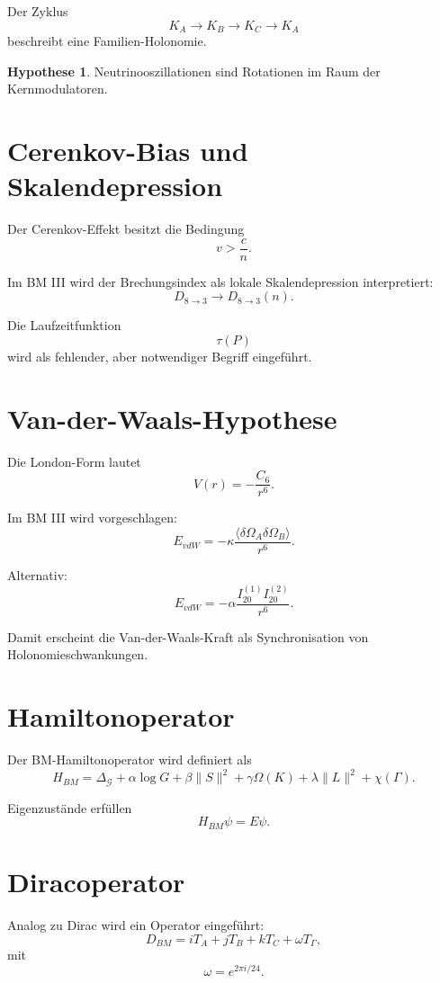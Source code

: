 \documentclass[11pt,a4paper]{article}
\theoremstyle{definition}
\newtheorem{hypothese}[satz]{Hypothese}
\begin{document}
	Der Zyklus
	\[
	K_A\to K_B\to K_C\to K_A
	\]
	beschreibt eine Familien-Holonomie.
	
	\begin{hypothese}
		Neutrinooszillationen sind Rotationen im Raum der Kernmodulatoren.
	\end{hypothese}
	
	\section{Cerenkov-Bias und Skalendepression}
	
	Der Cerenkov-Effekt besitzt die Bedingung
	\[
	v>\frac{c}{n}.
	\]
	
	Im BM III wird der Brechungsindex als lokale Skalendepression interpretiert:
	\[
	D_{8\to3}\to D_{8\to3}(n).
	\]
	
	Die Laufzeitfunktion
	\[
	\tau(P)
	\]
	wird als fehlender, aber notwendiger Begriff eingeführt.
	
	\section{Van-der-Waals-Hypothese}
	
	Die London-Form lautet
	\[
	V(r)=-\frac{C_6}{r^6}.
	\]
	
	Im BM III wird vorgeschlagen:
	\[
	E_{vdW}=
	-\kappa\frac{\langle\delta\Omega_A\delta\Omega_B\rangle}{r^6}.
	\]
	
	Alternativ:
	\[
	E_{vdW}=
	-\alpha\frac{I_{20}^{(1)}I_{20}^{(2)}}{r^6}.
	\]
	
	Damit erscheint die Van-der-Waals-Kraft als Synchronisation von Holonomieschwankungen.
	
	\section{Hamiltonoperator}
	
	Der BM-Hamiltonoperator wird definiert als
	\[
	H_{BM}
	=
	\Delta_{\mathcal G}
	+
	\alpha\log G
	+
	\beta\|S\|^2
	+
	\gamma\Omega(K)
	+
	\lambda\|L\|^2
	+
	\chi(\Gamma).
	\]
	
	Eigenzustände erfüllen
	\[
	H_{BM}\psi=E\psi.
	\]
	
	\section{Diracoperator}
	
	Analog zu Dirac wird ein Operator eingeführt:
	\[
	D_{BM}
	=
	iT_A+jT_B+kT_C+\omega T_\Gamma,
	\]
	mit
	\[
	\omega=e^{2\pi i/24}.
	\]
	
\end{document}
